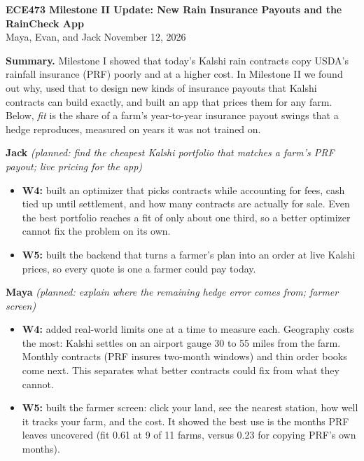 \documentclass[10pt]{article}
\newcommand{\head}[1]{\par\vspace{4pt}{\large\bfseries #1}\par\vspace{1pt}}
\newcommand{\person}[2]{\par\vspace{2pt}\textbf{#1} \textit{(planned: #2)}}
\begin{document}
\begin{center}
  {\large\bfseries ECE473 Milestone II Update: New Rain Insurance Payouts and
  the RainCheck App}\\[1pt]
  Maya, Evan, and Jack \quad\textbullet\quad November 12, 2026
\end{center}
\vspace{-8pt}

\textbf{Summary.} Milestone I showed that today's Kalshi rain contracts copy
USDA's rainfall insurance (PRF) poorly and at a higher cost. In Milestone II we
found out why, used that to design new kinds of insurance payouts that Kalshi
contracts can build exactly, and built an app that prices them for any farm.
Below, \emph{fit} is the share of a farm's year-to-year insurance payout swings
that a hedge reproduces, measured on years it was not trained on.

\head{1. Planned vs.\ actual progress}

\person{Jack}{find the cheapest Kalshi portfolio that matches a farm's PRF
payout; live pricing for the app}
\begin{itemize}
  \item \textbf{W4:} built an optimizer that picks contracts while accounting
    for fees, cash tied up until settlement, and how many contracts are
    actually for sale. Even the best portfolio reaches a fit of only about one
    third, so a better optimizer cannot fix the problem on its own.
  \item \textbf{W5:} built the backend that turns a farmer's plan into an
    order at live Kalshi prices, so every quote is one a farmer could pay
    today.
\end{itemize}

\person{Maya}{explain where the remaining hedge error comes from; farmer
screen}
\begin{itemize}
  \item \textbf{W4:} added real-world limits one at a time to measure each.
    Geography costs the most: Kalshi settles on an airport gauge 30 to 55
    miles from the farm. Monthly contracts (PRF insures two-month windows)
    and thin order books come next. This separates what better contracts
    could fix from what they cannot.
  \item \textbf{W5:} built the farmer screen: click your land, see the nearest
    station, how well it tracks your farm, and the cost. It showed the best
    use is the months PRF leaves uncovered (fit 0.61 at 9 of 11 farms, versus
    0.23 for copying PRF's own months).
\end{itemize}
\end{document}
